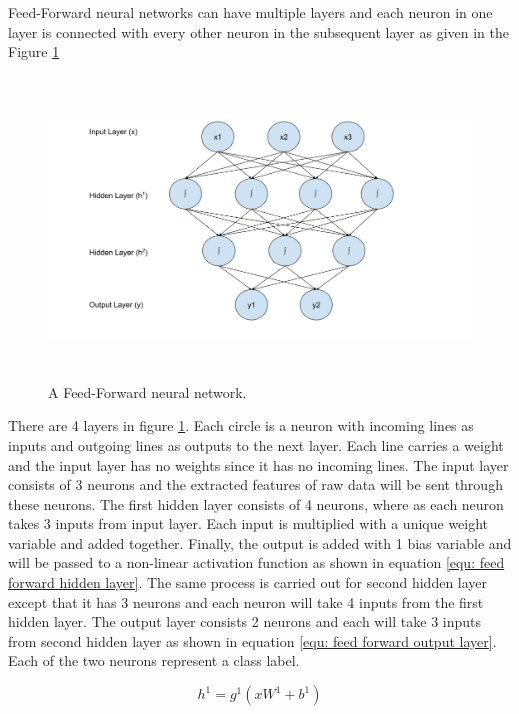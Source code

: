 \documentclass[a4paper, 11pt]{article}
\begin{document}
Feed-Forward neural networks \cite{Svozil1997} can have multiple layers and each neuron in one layer is connected with every other neuron in the subsequent layer as given in the Figure \ref{fig:Feed forward neural network}

\begin{figure}[htpb]
    \centering
    \includegraphics[width=\textwidth,height=8cm,keepaspectratio=true]
    {feed-forward-neural-network.png}
    \caption{
        A Feed-Forward neural network.
    }
    \label{fig:Feed forward neural network}
\end{figure}

There are 4 layers in figure \ref{fig:Feed forward neural network}. Each circle is a neuron with incoming lines as inputs and outgoing lines as outputs to the next layer. Each line carries a weight and the input layer has no weights since it has no incoming lines. The input layer consists of 3 neurons and the extracted features of raw data will be sent through these neurons. The first hidden layer consists of 4 neurons, where as each neuron takes 3 inputs from input layer. Each input is multiplied with a unique weight variable and added together.  Finally, the output is added with 1 bias variable and will be passed to a non-linear activation function as shown in equation \ref{equ: feed forward hidden layer}. The same process is carried out for second hidden layer except that it has 3 neurons and each neuron will take 4 inputs from the first hidden layer. The output layer consists 2 neurons and each will take 3 inputs from second hidden layer as shown in equation \ref{equ: feed forward output layer}. Each of the two neurons represent a class label.

\begin{equation} \label{equ: feed forward hidden layer}
h^1 = g^1(xW^1 + b^1)
\end{equation}
\end{document}
